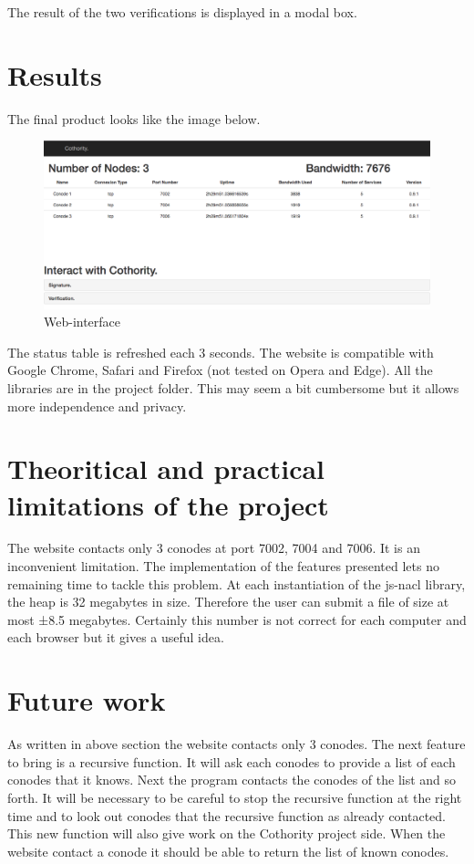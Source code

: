 \documentclass[11pt, a4paper, twoside, openright, openany]{article} %
\begin{document}
The result of the two verifications is displayed in a modal box.
\bigbreak

\section{Results}
The final product looks like the image below.
\bigbreak

\begin{figure}[ht!]
\centering
\includegraphics[width=125mm]{interface.jpg}
\caption{Web-interface}
\end{figure}
\leavevmode \newline

The status table is refreshed each 3 seconds.
\newline
The website is compatible with Google Chrome, Safari and Firefox (not tested on Opera and Edge).
\newline
All the libraries are in the project folder. This may seem a bit cumbersome but
it allows more independence and privacy.
\newline

\section{Theoritical and practical limitations of the project}
The website contacts only 3 conodes at port 7002, 7004 and 7006. It is an inconvenient
limitation. The implementation of the features presented lets no remaining time to tackle
this problem.
\newline
At each instantiation of the js-nacl library, the heap is 32 megabytes in size. Therefore
the user can submit a file of size at most ±8.5 megabytes. Certainly this number is
not correct for each computer and each browser but it gives a useful idea.
\newline

\section{Future work}
As written in above section the website contacts only 3 conodes. The next feature
to bring is a recursive function. It will ask each conodes to provide a list of each conodes
that it knows. Next the program contacts the conodes of the list and so forth.
\newline
It will be necessary to be careful to stop the recursive function at the right time and
to look out conodes that the recursive function as already contacted.
\newline
This new function will also give work on the Cothority project side. When the website
contact a conode it should be able to return the list of known conodes.
\bigbreak
\end{document}
